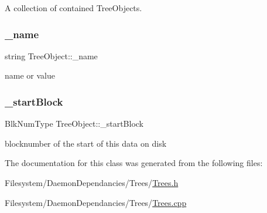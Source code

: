 A collection of contained Tree\+Objects. 

\mbox{\label{class_tree_object_a368b410ed9b21c7106babf2ba93399b3}} 
\subsubsection{\texorpdfstring{\+\_\+name}{\_name}}
{\footnotesize\ttfamily string Tree\+Object\+::\+\_\+name\hspace{0.3cm}{\ttfamily [protected]}}



name or value 

\mbox{\label{class_tree_object_a5872ffdaa0c1a0cbf393da9a8a7657f3}} 
\subsubsection{\texorpdfstring{\+\_\+start\+Block}{\_startBlock}}
{\footnotesize\ttfamily Blk\+Num\+Type Tree\+Object\+::\+\_\+start\+Block\hspace{0.3cm}{\ttfamily [protected]}}



blocknumber of the start of this data on disk 



The documentation for this class was generated from the following files\+:\begin{DoxyCompactItemize}
\item 
Filesystem/\+Daemon\+Dependancies/\+Trees/\mbox{\hyperlink{_trees_8h}{Trees.\+h}}\item 
Filesystem/\+Daemon\+Dependancies/\+Trees/\mbox{\hyperlink{_trees_8cpp}{Trees.\+cpp}}\end{DoxyCompactItemize}
